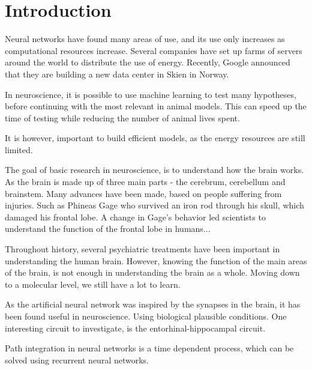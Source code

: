\section{Introduction}\label{sec:introduction}
Neural networks have found many areas of use, and its use only increases as computational resources increase. Several companies have set up farms of servers around the world to distribute the use of energy. Recently, Google announced that they are building a new data center in Skien in Norway. 

In neuroscience, it is possible to use machine learning to test many hypotheses, before continuing with the most relevant in animal models. This can speed up the time of testing while reducing the number of animal lives spent.

It is however, important to build efficient models, as the energy resources are still limited. 

The goal of basic research in neuroscience, is to understand how the brain works. As the brain is made up of three main parts - the cerebrum, cerebellum and brainstem. Many advances have been made, based on people suffering from injuries. Such as Phineas Gage who survived an iron rod through his skull, which damaged his frontal lobe. A change in Gage's behavior led scientists to understand the function of the frontal lobe in humans...

Throughout history, several psychiatric treatments have been important in understanding the human brain. However, knowing the function of the main areas of the brain, is not enough in understanding the brain as a whole. Moving down to a molecular level, we still have a lot to learn. 

As the artificial neural network was inspired by the synapses in the brain, it has been found useful in neuroscience. Using biological plausible conditions. One interesting circuit to investigate, is the entorhinal-hippocampal circuit. 

Path integration in neural networks is a time dependent process, which can be solved using recurrent neural networks.